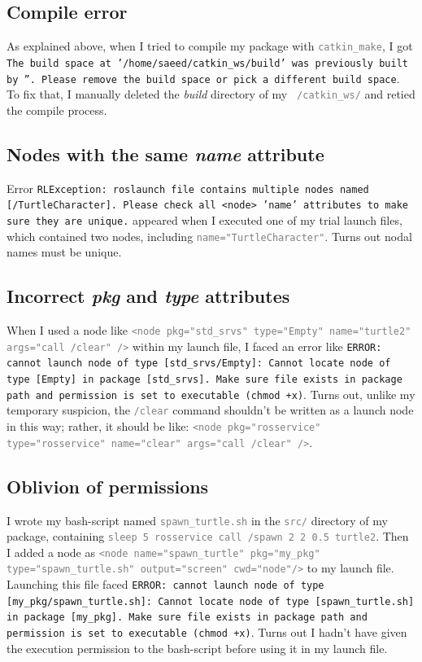 \documentclass[conference]{IEEEtran}
\newcommand{\error}[1]{\textcolor{red!75!black}{\footnotesize \texttt{#1}}}
\newcommand{\command}[1]{\textcolor{gray}{\footnotesize \texttt{#1}}}
\begin{document}
\subsection{Compile error}
\label{sec:Compile_error}
As explained above, when I tried to compile my package with \command{catkin\_make}, I got \error{The build space at '/home/saeed/catkin\_ws/build' was previously built by ''. Please remove the build space or pick a different build space}. To fix that, I manually deleted the \textit{build} directory of my \command{~/catkin\_ws/} and retied the compile process.
\vspace{10px}


\subsection{Nodes with the same \textit{name} attribute}
\label{sec:Nodes_with}
Error \error{RLException: roslaunch file contains multiple nodes named [/TurtleCharacter].
    Please check all <node> 'name' attributes to make sure they are unique.} appeared when I executed one of my trial launch files, which contained two nodes, including \command{name="TurtleCharacter"}. Turns out nodal names must be unique.
\vspace{10px}


\subsection{Incorrect \textit{pkg} and \textit{type} attributes}
\label{sec:Incorrect_pkg}
When I used a node like \command{<node pkg="std\_srvs" type="Empty" name="turtle2" args="call /clear" />} within my launch file, I faced an error like \error{ERROR: cannot launch node of type [std\_srvs/Empty]: Cannot locate node of type [Empty] in package [std\_srvs]. Make sure file exists in package path and permission is set to executable (chmod +x)}. Turns out, unlike my temporary suspicion, the \command{/clear} command shouldn't be written as a launch node in this way; rather, it should be like: \command{<node pkg="rosservice" type="rosservice" name="clear" args="call /clear" />}.
\vspace{10px}


\subsection{Oblivion of permissions}
\label{sec:Oblivion_of}
I wrote my bash-script named \command{spawn\_turtle.sh} in the \command{src/} directory of my package, containing \command{sleep 5
    rosservice call /spawn 2 2 0.5 turtle2}. Then I added a node as \command{<node name="spawn\_turtle" pkg="my\_pkg" type="spawn\_turtle.sh" output="screen" cwd="node"/>} to my launch file. Launching this file faced \error{ERROR: cannot launch node of type [my\_pkg/spawn\_turtle.sh]: Cannot locate node of type [spawn\_turtle.sh] in package [my\_pkg]. Make sure file exists in package path and permission is set to executable (chmod +x)}. Turns out I hadn't have given the execution permission to the bash-script before using it in my launch file.
\vspace{10px}
\end{document}
